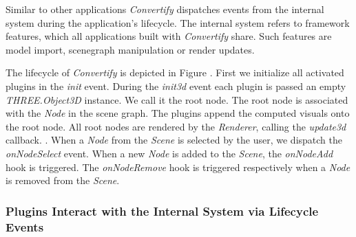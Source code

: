 \documentclass[../ClassicThesis.tex]{subfiles}
\begin{document}
Similar to other applications \emph{Convertify}
dispatches events from the internal system during the application's lifecycle.
The internal system refers to framework features, which all applications built
with \emph{Convertify} share. Such features are model import, scenegraph
manipulation or render updates.


The lifecycle of \emph{Convertify} is depicted in Figure . First we initialize all activated plugins in the
\emph{init} event. During the \emph{init3d} event each plugin is passed an empty
\emph{THREE.Object3D} instance. We call it the root node. The root node is
associated with the \emph{Node} in the scene graph. The plugins append
the computed visuals onto the root node. All root nodes are rendered by the
\emph{Renderer}, calling the \emph{update3d} callback. . When a \emph{Node} from the \emph{Scene} is selected by the user, we
dispatch the \emph{onNodeSelect} event. When a new \emph{Node} is added to the
\emph{Scene}, the \emph{onNodeAdd} hook is triggered. The \emph{onNodeRemove}
hook is triggered respectively when a \emph{Node} is removed from the
\emph{Scene}. 



\subsubsection{Plugins Interact with the Internal System via Lifecycle Events}
\end{document}
